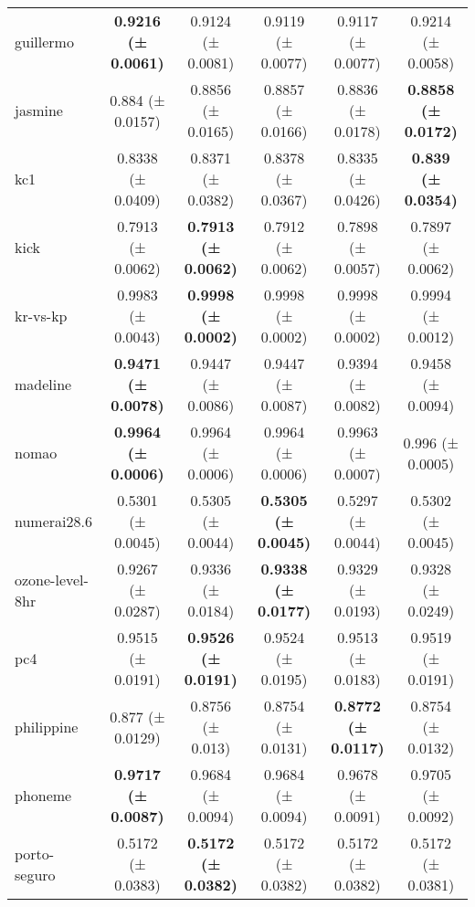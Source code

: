 \documentclass[11pt]{article}
\begin{document}
\begin{table}[]
{\begin{tabular}{@{}lccccc@{}}
guillermo           & \textbf{0.9216 (± 0.0061)} & 0.9124 (± 0.0081)          & 0.9119 (± 0.0077)          & 0.9117 (± 0.0077)          & 0.9214 (± 0.0058)          \\
jasmine             & 0.884 (± 0.0157)           & 0.8856 (± 0.0165)          & 0.8857 (± 0.0166)          & 0.8836 (± 0.0178)          & \textbf{0.8858 (± 0.0172)} \\
kc1                 & 0.8338 (± 0.0409)          & 0.8371 (± 0.0382)          & 0.8378 (± 0.0367)          & 0.8335 (± 0.0426)          & \textbf{0.839 (± 0.0354)}  \\
kick                & 0.7913 (± 0.0062)          & \textbf{0.7913 (± 0.0062)} & 0.7912 (± 0.0062)          & 0.7898 (± 0.0057)          & 0.7897 (± 0.0062)          \\
kr-vs-kp            & 0.9983 (± 0.0043)          & \textbf{0.9998 (± 0.0002)} & 0.9998 (± 0.0002)          & 0.9998 (± 0.0002)          & 0.9994 (± 0.0012)          \\
madeline            & \textbf{0.9471 (± 0.0078)} & 0.9447 (± 0.0086)          & 0.9447 (± 0.0087)          & 0.9394 (± 0.0082)          & 0.9458 (± 0.0094)          \\
nomao               & \textbf{0.9964 (± 0.0006)} & 0.9964 (± 0.0006)          & 0.9964 (± 0.0006)          & 0.9963 (± 0.0007)          & 0.996 (± 0.0005)           \\
numerai28.6         & 0.5301 (± 0.0045)          & 0.5305 (± 0.0044)          & \textbf{0.5305 (± 0.0045)} & 0.5297 (± 0.0044)          & 0.5302 (± 0.0045)          \\
ozone-level-8hr     & 0.9267 (± 0.0287)          & 0.9336 (± 0.0184)          & \textbf{0.9338 (± 0.0177)} & 0.9329 (± 0.0193)          & 0.9328 (± 0.0249)          \\
pc4                 & 0.9515 (± 0.0191)          & \textbf{0.9526 (± 0.0191)} & 0.9524 (± 0.0195)          & 0.9513 (± 0.0183)          & 0.9519 (± 0.0191)          \\
philippine          & 0.877 (± 0.0129)           & 0.8756 (± 0.013)           & 0.8754 (± 0.0131)          & \textbf{0.8772 (± 0.0117)} & 0.8754 (± 0.0132)          \\
phoneme             & \textbf{0.9717 (± 0.0087)} & 0.9684 (± 0.0094)          & 0.9684 (± 0.0094)          & 0.9678 (± 0.0091)          & 0.9705 (± 0.0092)          \\
porto-seguro        & 0.5172 (± 0.0383)          & \textbf{0.5172 (± 0.0382)} & 0.5172 (± 0.0382)          & 0.5172 (± 0.0382)          & 0.5172 (± 0.0381)          \\

\end{tabular}}
\end{table}
\end{document}
